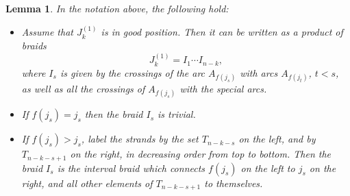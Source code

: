 \documentclass[10pt]{amsart}
\theoremstyle{plain}
\newtheorem{lemma}[thm]{Lemma}
\theoremstyle{definition}
\newtheorem{definition}[thm]{Definition}
\theoremstyle{remark}
\numberwithin{equation}{section}
\newcommand{\MG}[1]{{\color{teal}{{\bf Misha}: #1}}}
\begin{document}
\begin{lemma}
\label{lem: j1 from intervals} In the notation above, the following hold:

\begin{itemize}
    \item[(a)] Assume that $J_k^{(1)}$ is in good position. Then it can be written as a product of braids 
$$
J_k^{(1)}=I_1\cdots I_{n-k},
$$
where $I_s$ is given by the crossings of the arc $A_{f(j_s)}$ with arcs $A_{f(j_t)}$, $t<s$, 
as well as all the crossings of $A_{f(j_s)}$ with the special arcs.

\item[(b)] If $f(j_s)=j_s$ then the braid $I_s$ is trivial.

\item[(c)] If $f(j_s)>j_s$, label the strands by the set $T_{n-k-s}$ on the left, and by $T_{n-k-s+1}$ on the right, in decreasing order from top to bottom.
Then the braid $I_s$ is the interval braid which connects  $f(j_s)$ on the left to $j_s$ on the right, and all other elements of $T_{n-k-s+1}$ to themselves.
\end{itemize}
\end{lemma}



\end{document}
